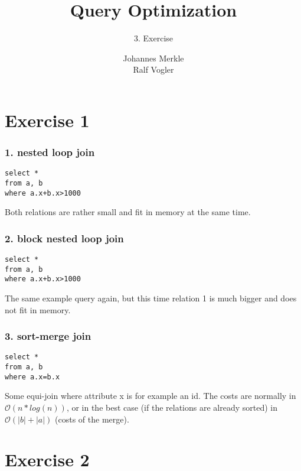 \documentclass[11pt,a4paper]{scrartcl}
\begin{document}
\author{Johannes Merkle\\Ralf Vogler}
\title{Query Optimization}
\subtitle{3. Exercise}

\maketitle

\section*{Exercise 1}

\subsubsection*{1. nested loop join}
\begin{verbatim}
select *
from a, b
where a.x+b.x>1000
\end{verbatim}
Both relations are rather small and fit in memory at the same time.


\subsubsection*{2. block nested loop join}
\begin{verbatim}
select *
from a, b
where a.x+b.x>1000
\end{verbatim}
The same example query again, but this time relation 1 is much bigger and does not fit in memory.


\subsubsection*{3. sort-merge join}
\begin{verbatim}
select *
from a, b
where a.x=b.x
\end{verbatim}
Some equi-join where attribute x is for example an id. The costs are normally in $\mathcal{O}(n*log(n))$, or in the best case (if the relations are already sorted) in $\mathcal{O}(|b| + |a|)$ (costs of the merge).


\section*{Exercise 2}
\end{document}
